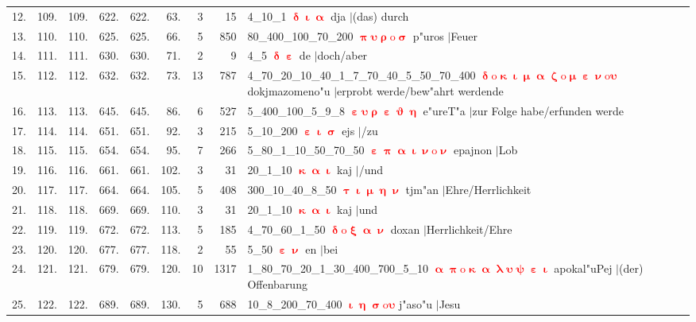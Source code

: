 \documentclass[a4paper,10pt,landscape]{article}
\begin{document}
\begin{tabular}{rrrrrrrrp{120mm}}
12.&109.&109.&622.&622.&63.&3&15&4\_10\_1 \textcolor{red}{$\boldsymbol{\updelta\upiota\upalpha}$} dja $|$(das) durch\\
13.&110.&110.&625.&625.&66.&5&850&80\_400\_100\_70\_200 \textcolor{red}{$\boldsymbol{\uppi\upsilon\uprho\mathrm{o}\upsigma}$} p"uros $|$Feuer\\
14.&111.&111.&630.&630.&71.&2&9&4\_5 \textcolor{red}{$\boldsymbol{\updelta\upepsilon}$} de $|$doch/aber\\
15.&112.&112.&632.&632.&73.&13&787&4\_70\_20\_10\_40\_1\_7\_70\_40\_5\_50\_70\_400 \textcolor{red}{$\boldsymbol{\updelta\mathrm{o}\upkappa\upiota\upmu\upalpha\upzeta\mathrm{o}\upmu\upepsilon\upnu\mathrm{o}\upsilon}$} dokjmazomeno"u $|$erprobt werde/bew"ahrt werdende\\
16.&113.&113.&645.&645.&86.&6&527&5\_400\_100\_5\_9\_8 \textcolor{red}{$\boldsymbol{\upepsilon\upsilon\uprho\upepsilon\upvartheta\upeta}$} e"ureT"a $|$zur Folge habe/erfunden werde\\
17.&114.&114.&651.&651.&92.&3&215&5\_10\_200 \textcolor{red}{$\boldsymbol{\upepsilon\upiota\upsigma}$} ejs $|$/zu\\
18.&115.&115.&654.&654.&95.&7&266&5\_80\_1\_10\_50\_70\_50 \textcolor{red}{$\boldsymbol{\upepsilon\uppi\upalpha\upiota\upnu\mathrm{o}\upnu}$} epajnon $|$Lob\\
19.&116.&116.&661.&661.&102.&3&31&20\_1\_10 \textcolor{red}{$\boldsymbol{\upkappa\upalpha\upiota}$} kaj $|$/und\\
20.&117.&117.&664.&664.&105.&5&408&300\_10\_40\_8\_50 \textcolor{red}{$\boldsymbol{\uptau\upiota\upmu\upeta\upnu}$} tjm"an $|$Ehre/Herrlichkeit\\
21.&118.&118.&669.&669.&110.&3&31&20\_1\_10 \textcolor{red}{$\boldsymbol{\upkappa\upalpha\upiota}$} kaj $|$und\\
22.&119.&119.&672.&672.&113.&5&185&4\_70\_60\_1\_50 \textcolor{red}{$\boldsymbol{\updelta\mathrm{o}\upxi\upalpha\upnu}$} doxan $|$Herrlichkeit/Ehre\\
23.&120.&120.&677.&677.&118.&2&55&5\_50 \textcolor{red}{$\boldsymbol{\upepsilon\upnu}$} en $|$bei\\
24.&121.&121.&679.&679.&120.&10&1317&1\_80\_70\_20\_1\_30\_400\_700\_5\_10 \textcolor{red}{$\boldsymbol{\upalpha\uppi\mathrm{o}\upkappa\upalpha\uplambda\upsilon\uppsi\upepsilon\upiota}$} apokal"uPej $|$(der) Offenbarung\\
25.&122.&122.&689.&689.&130.&5&688&10\_8\_200\_70\_400 \textcolor{red}{$\boldsymbol{\upiota\upeta\upsigma\mathrm{o}\upsilon}$} j"aso"u $|$Jesu\\
\end{tabular}
\end{document}
